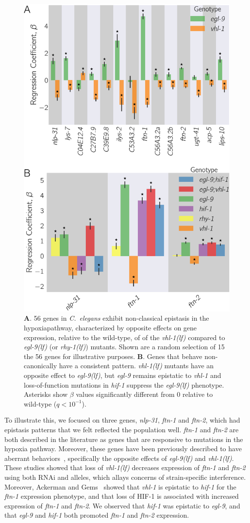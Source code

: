 \documentclass[9pt,twocolumn,twoside,lineno]{pnas-new}
\newcommand{\qval}[1]{$q<10^{-#1}$}
\newcommand{\cel}{\emph{C.~elegans}}
\newcommand{\gene}[1]{\emph{#1}}
\newcommand{\nlp}{\emph{\mbox{nlp-31}}}
\newcommand{\ftna}{\emph{\mbox{ftn-1}}}
\newcommand{\ftnb}{\emph{\mbox{ftn-2}}}
\newcommand{\egl}{\emph{\mbox{egl-9}(lf)}}
\newcommand{\rhy}{\emph{\mbox{rhy-1}(lf)}}
\newcommand{\vhl}{\emph{\mbox{vhl-1}(lf)}}
\newcommand{\hifp}{HIF-1}
\newcommand{\hifohtargets}{56}
\begin{document}
\begin{figure}[tbhp]
\centering
\includegraphics[width=.4\textwidth]{../figs/hif1oh_epistasis.pdf}
\caption{
\textbf{A}. \hifohtargets{} genes in \cel{} exhibit non-classical epistasis in
the hypoxiapathway, characterized by opposite effects on gene expression, relative
to the wild-type, of of the \vhl{} compared to \egl{} (or
\rhy{}) mutants. Shown are a random selection of 15 the \hifohtargets{} genes for
illustrative purposes.
\textbf{B}. Genes that behave non-canonically  have a consistent pattern. \vhl{}
mutants have an opposite effect to \egl{}, but \gene{egl-9} remains epistatic to
\gene{vhl-1} and loss-of-function mutations in \gene{hif-1} suppress the \egl{}
phenotype. Asterisks show $\beta$ values significantly different from 0 relative
to wild-type (\qval{1}).
}
\label{fig:hif1oh}
\end{figure}

To illustrate this, we focused on three genes, \nlp{}, \ftna{} and \ftnb{}, which
had epistasis patterns that we felt reflected the population well. \ftna{} and
\ftnb{} are both described in the literature as genes that are responsive to
mutations in the hypoxia pathway. Moreover, these genes have been previously
described to have aberrant behaviors~\cite{Ackerman2012,Romney2011}, specifically
the opposite effects of \egl{} and \vhl{}. These studies showed that loss of \vhl{}
decreases expression of \ftna{} and \ftnb{} using both RNAi and alleles, which
allays concerns of strain-specific interference. Moreover, Ackerman and
Gems~\cite{Ackerman2012} showed that \gene{vhl-1} is epistatic to \gene{hif-1}
for the \ftna{} expression phenotype, and that loss of \hifp{} is associated with
increased expression of \ftna{} and \ftnb{}. We observed that \gene{hif-1} was
epistatic to \gene{egl-9}, and that \gene{egl-9} and \gene{hif-1} both promoted
\ftna{} and \ftnb{} expression.
\end{document}
